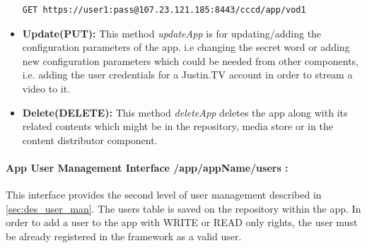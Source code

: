 \begin{itemize}
\begin{code}
\begin{verbatim}
GET https://user1:pass@107.23.121.185:8443/cccd/app/vod1
\end{verbatim}
\end{code}

\item \textbf{Update(PUT):}  This method \textit{updateApp} is for updating/adding the configuration parameters of the app. i.e changing the secret word or adding new configuration parameters which could be needed from other components, i.e. adding the user credentials for a Justin.TV account in order to stream a video to it.

\item \textbf{Delete(DELETE):} This method \textit{deleteApp} deletes the app along with its related contents which might be in the repository, media store or in the content distributor component.

\end{itemize}

\paragraph{App User Management Interface /app/{appName}/users :} This interface provides the second level of user management described in \ref{sec:des_user_man}. The users table is saved on the repository within the app. In order to add a user to the app with WRITE or READ only rights, the user must be already registered in the framework as a valid user.

